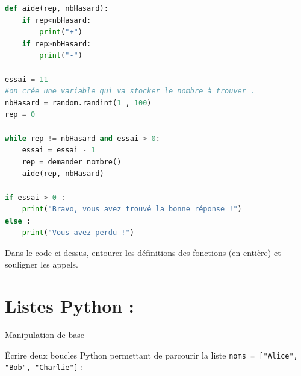 \documentclass[a4paper, noanswers, addpoints, 12pt]{exam}
\begin{document}
\begin{questions}
\begin{lstlisting}[style=mystyle, language=Python]
def aide(rep, nbHasard):
    if rep<nbHasard:
        print("+")
    if rep>nbHasard:
        print("-")
        
essai = 11
#on crée une variable qui va stocker le nombre à trouver .
nbHasard = random.randint(1 , 100)
rep = 0

while rep != nbHasard and essai > 0:
    essai = essai - 1
    rep = demander_nombre()
    aide(rep, nbHasard)

if essai > 0 :
    print("Bravo, vous avez trouvé la bonne réponse !")
else :
    print("Vous avez perdu !")
\end{lstlisting}
\question[3] Dans le code ci-dessus, entourer les définitions des fonctions (en entière) et souligner les appels.

\newpage

\section{Listes Python : }

\question[1\half] Manipulation de base

\question[2] Écrire deux boucles Python permettant de parcourir la liste \texttt{noms = ["Alice", "Bob", "Charlie"]} :


\end{questions}
\end{document}
